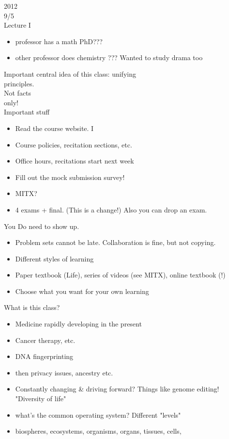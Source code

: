 2012\\
9/5\\
Lecture I\\
\begin{itemize}\item  professor has a math PhD???
\item  other professor does chemistry ??? Wanted to study drama too
\end{itemize}
Important central idea of this class: unifying\\
principles.\\
Not facts\\
only!\\
Important stuff\\
\begin{itemize}\item  Read the course website.
I \item  Course policies, recitation sections, etc.
\item  Office hours, recitations start next week
\item  Fill out the mock submission survey!
\item  MITX?
\item 4 exams + final. (This is a change!) Also you can drop an exam.
\end{itemize}
You Do need to show up.\\
\begin{itemize}\item  Problem sets cannot be late. Collaboration is fine, but not copying.
\item  Different styles of learning
\item  Paper textbook (Life), series of videos (see MITX), online textbook (!)
\item  Choose what you want for your own learning
\end{itemize}
What is this class?\\
\begin{itemize}\item  Medicine rapidly developing in the present
\item  Cancer therapy, etc.
\item  DNA fingerprinting \item  then privacy issues, ancestry etc.
\item  Constantly changing \& driving forward? Things like genome editing!
"Diversity of life" \item  what's the common operating system?
Different "levels" \item  biospheres, ecosystems, organisms, organs, tissues, cells,
\end{itemize}
